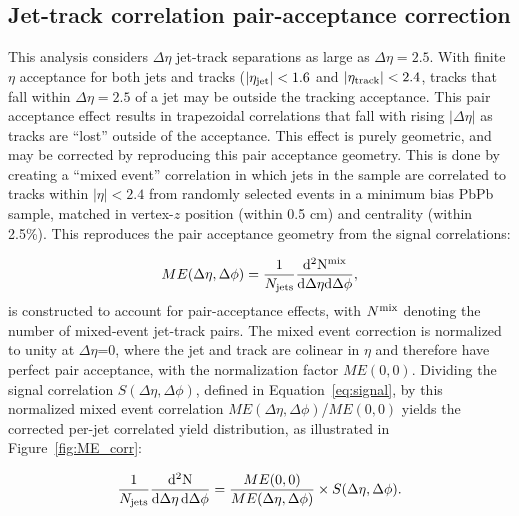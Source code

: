 \clearpage

\subsection{Jet-track correlation pair-acceptance correction}

This analysis considers $\Delta\eta$ jet-track separations as large as $\Delta\eta = 2.5$.  With finite $\eta$ acceptance for both jets and tracks ($|\eta_{\rm jet}| < 1.6$ and $|\eta_{\rm track}| < 2.4$, tracks that fall within $\Delta\eta = 2.5$ of a jet may be outside the tracking acceptance.  This pair acceptance effect results in trapezoidal correlations that fall with rising $|\Delta\eta|$ as tracks are ``lost'' outside of the acceptance.  This effect is purely geometric, and may be corrected by reproducing this pair acceptance geometry.  This is done by creating a ``mixed event'' correlation in which jets in the sample are correlated to tracks within $|\eta| < 2.4$ from randomly selected events in a minimum bias PbPb sample, matched in vertex-$z$ position (within 0.5 cm) and centrality (within 2.5\%).  This reproduces the pair acceptance geometry from the signal correlations: 
  
  \begin{equation}
  \label{eq:background}
  ME(\Delta\eta,\Delta\phi) = \frac{1}{N_{\rm jets}}\frac{\rm d^{2}N^{\rm mix}}{\rm d\Delta\eta d\Delta\phi},
  \end{equation}
  is constructed to account for pair-acceptance effects, with $N^{\rm mix}$ denoting the number of mixed-event jet-track pairs.  The mixed event correction is normalized to unity at $\Delta\eta$=0, where the jet and track are colinear in $\eta$ and therefore have perfect pair acceptance, with the normalization factor $ME(0,0)$.  Dividing the signal correlation $S(\Delta\eta,\Delta\phi)$, defined in Equation~\ref{eq:signal}, by this normalized mixed event correlation $ME(\Delta\eta,\Delta\phi)$/$ME(0,0)$ yields the corrected per-jet correlated yield distribution, as illustrated in Figure~\ref{fig:ME_corr}: 

  \begin{equation}
  \label{2pcorr_incl}
  \frac{1}{N_{\rm jets}}\frac{\rm d^{2} N}{\rm d\Delta\eta\, \rm d\Delta\phi}
  = \frac{ME(0,0)}{ME(\Delta\eta,\Delta\phi)}\times S(\Delta\eta,\Delta\phi).
  \end{equation}
  
